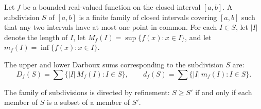 Let $f$ be a bounded real-valued function on the closed interval $[a,b]$. A subdivision $S$ of $[a,b]$ is a finite family of closed intervals covering $[a,b]$ such that any two intervals have at most one point in common. For each $I \in S$, let $|I|$ denote the length of $I$, let $M_f(I) = \sup\{f(x) : x \in I\}$, and let $m_f(I) = \inf\{f(x) : x \in I\}$.

The upper and lower Darboux sums corresponding to the subdivision $S$ are:
$$D_f(S) = \sum\{|I| \, M_f(I) : I \in S\}, \qquad d_f(S) = \sum\{|I| \, m_f(I) : I \in S\}.$$

The family of subdivisions is directed by refinement: $S \geq S'$ if and only if each member of $S$ is a subset of a member of $S'$.
